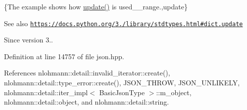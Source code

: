 \{The example shows how {\ttfamily \hyperlink{classnlohmann_1_1basic__json_a1cfa9ae5e7c2434cab4cfe69bffffe11}{update()}} is used\+\_\+\+\_\+range.,update\}

\begin{DoxySeeAlso}{See also}
\href{https://docs.python.org/3.6/library/stdtypes.html#dict.update}{\tt https\+://docs.\+python.\+org/3./library/stdtypes.\+html\#dict.\+update}
\end{DoxySeeAlso}
\begin{DoxySince}{Since}
version 3.. 
\end{DoxySince}


Definition at line 14757 of file json.\+hpp.



References nlohmann\+::detail\+::invalid\+\_\+iterator\+::create(), nlohmann\+::detail\+::type\+\_\+error\+::create(), J\+S\+O\+N\+\_\+\+T\+H\+R\+OW, J\+S\+O\+N\+\_\+\+U\+N\+L\+I\+K\+E\+LY, nlohmann\+::detail\+::iter\+\_\+impl$<$ Basic\+Json\+Type $>$\+::m\+\_\+object, nlohmann\+::detail\+::object, and nlohmann\+::detail\+::string.


